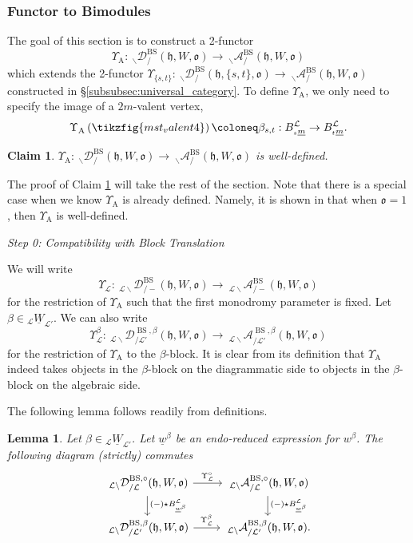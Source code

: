 \documentclass{amsart}
\newcommand{\scrL}{\mathcal{L}}
\newcommand{\fr}[1]{\mathfrak{#1}}
\DeclareMathOperator{\Abe}{A}
\DeclareMathOperator{\BS}{BS}
\newcommand{\EWmon}[2]{\:_{#1 \backslash} \mathcal{D}_{/ #2} }
\newcommand{\Amon}[2]{\:_{#1 \backslash} \mathcal{A}_{/ #2} }
\newcommand{\uW}[2]{{}_{#1}\underline{W}_{#2}}
\newcommand{\uw}{\underline{w}}
\newtheorem{lemma}[subsubsection]{Lemma}
\newtheorem{claim}[subsubsection]{Claim}
\theoremstyle{definition}
\numberwithin{equation}{subsection}
\begin{document}
\subsubsection{Functor to Bimodules}

The goal of this section is to construct a 2-functor
\[ \Upsilon_{\Abe} : \EWmon{}{}^{\BS} (\fr{h}, W, \fr{o}) \to \Amon{}{}^{\BS} (\fr{h}, W, \fr{o})\]
which extends the 2-functor $\Upsilon_{\{s,t\}} : \EWmon{}{}^{\BS} (\fr{h}, \{s,t\}, \fr{o}) \to \Amon{}{}^{\BS} (\fr{h}, W, \fr{o})$ constructed in \S \ref{subsubsec:universal_category}.
To define $\Upsilon_{\Abe}$, we only need to specify the image of a $2m$-valent vertex,
\[\Upsilon_{\Abe} \left( \tikzfig{mst_valent4} \right) \coloneq \beta_{s,t} : B_{{}_s \underline{m}}^{\scrL} \to B_{{}_t \underline{m}}^{\scrL}.\]

\begin{claim}\label{claim:dihedral_Phi_functor}
    $\Upsilon_{\Abe} : \EWmon{}{}^{\BS} (\fr{h}, W, \fr{o}) \to \Amon{}{}^{\BS} (\fr{h}, W, \fr{o})$ is well-defined.
\end{claim}

The proof of Claim \ref{claim:dihedral_Phi_functor} will take the rest of the section.
Note that there is a special case when we know $\Upsilon_{\Abe}$ is already defined. Namely, it is shown in \cite{Abe19} that when $\fr{o} = 1$, then $\Upsilon_{\Abe}$ is well-defined.

\noindent \emph{Step 0: Compatibility with Block Translation}

We will write
\[\Upsilon_{\scrL} : \EWmon{\scrL}{-}^{\BS} (\fr{h}, W, \fr{o}) \to \Amon{\scrL}{-}^{\BS} (\fr{h}, W, \fr{o})\]
for the restriction of $\Upsilon_{\Abe}$ such that the first monodromy parameter is fixed. Let $\beta \in \uW{\scrL}{\scrL'}$. We can also write
\[\Upsilon_{\scrL}^{\beta} : \EWmon{\scrL}{\scrL'}^{\BS, \beta} (\fr{h}, W, \fr{o}) \to \Amon{\scrL}{\scrL'}^{\BS, \beta} (\fr{h}, W, \fr{o})\]
for the restriction of $\Upsilon_{\Abe}$ to the $\beta$-block. 
It is clear from its definition that $\Upsilon_{\Abe}$ indeed takes objects in the $\beta$-block on the diagrammatic side to objects in the $\beta$-block on the algebraic side.

The following lemma follows readily from definitions.

\begin{lemma}\label{lem:Phi_and_block_translation}
    Let $\beta \in \uW{\scrL}{\scrL'}$. Let $\uw^{\beta}$ be an endo-reduced expression for $w^{\beta}$.  
    The following diagram (strictly) commutes
    \[
    \begin{tikzcd}
        {\EWmon{\scrL}{\scrL}^{\BS, \circ} (\fr{h}, W, \fr{o})} \arrow[d, "(-) \star B_{\uw^{\beta}}^{\scrL}"] \arrow[r, "\Upsilon_{\scrL}^{\circ}"] & {\Amon{\scrL}{\scrL}^{\BS, \circ} (\fr{h}, W, \fr{o})} \arrow[d, "(-) \star B_{\uw^{\beta}}^{\scrL}"] \\
        {\EWmon{\scrL}{\scrL'}^{\BS, \beta} (\fr{h}, W, \fr{o})} \arrow[r, "\Upsilon_{\scrL}^{\beta}"]      & {\Amon{\scrL}{\scrL'}^{\BS, \beta} (\fr{h}, W, \fr{o}).}                 
        \end{tikzcd}\]
\end{lemma}
\end{document}
